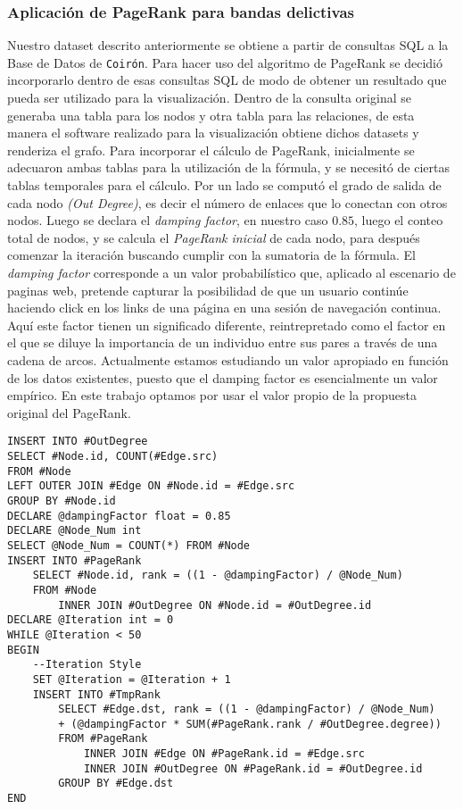 \subsubsection{Aplicación de PageRank para bandas delictivas}
Nuestro dataset descrito anteriormente se obtiene a partir de consultas SQL a la Base de Datos de \texttt{Coirón}. Para hacer uso del algoritmo de PageRank se decidió incorporarlo dentro de esas consultas SQL de modo de obtener un resultado que pueda ser utilizado para la visualización. Dentro de la consulta original se generaba una tabla para los nodos y otra tabla para las relaciones, de esta manera el software realizado para la visualización obtiene dichos datasets y renderiza el grafo.
Para incorporar el cálculo de PageRank, inicialmente se adecuaron ambas tablas para la utilización de la fórmula, y se necesitó de ciertas tablas temporales para el cálculo. Por un lado se computó el grado de salida de cada nodo \textit{(Out Degree)}, es decir el número de enlaces que lo conectan con otros nodos.
Luego se declara el \textit{damping factor}, en nuestro caso $0.85$, luego el conteo total de nodos, y se calcula el \textit{PageRank inicial} de cada nodo, para después comenzar la iteración buscando cumplir con la sumatoria de la fórmula.
El \textit{damping factor} corresponde a un valor probabilístico que, aplicado al escenario de paginas web, pretende capturar la posibilidad de que un usuario continúe haciendo click en los links de una página en una sesión de navegación continua. 
Aquí este factor tienen un significado diferente, reintrepretado como el factor en el que se diluye la importancia de un individuo entre sus pares a través de una cadena de arcos. Actualmente estamos estudiando un valor apropiado en función de los datos existentes, puesto que el damping factor es esencialmente un valor empírico. En este trabajo optamos por usar el valor propio de la propuesta original del PageRank.

\begin{multicols}{2}
\tiny{
\begin{verbatim}
INSERT INTO #OutDegree
SELECT #Node.id, COUNT(#Edge.src)
FROM #Node 
LEFT OUTER JOIN #Edge ON #Node.id = #Edge.src
GROUP BY #Node.id
DECLARE @dampingFactor float = 0.85
DECLARE @Node_Num int
SELECT @Node_Num = COUNT(*) FROM #Node
INSERT INTO #PageRank
	SELECT #Node.id, rank = ((1 - @dampingFactor) / @Node_Num)
	FROM #Node 
		INNER JOIN #OutDegree ON #Node.id = #OutDegree.id
DECLARE @Iteration int = 0
WHILE @Iteration < 50
BEGIN
	--Iteration Style
	SET @Iteration = @Iteration + 1
	INSERT INTO #TmpRank
		SELECT #Edge.dst, rank = ((1 - @dampingFactor) / @Node_Num) 
		+ (@dampingFactor * SUM(#PageRank.rank / #OutDegree.degree))
		FROM #PageRank 
			INNER JOIN #Edge ON #PageRank.id = #Edge.src
			INNER JOIN #OutDegree ON #PageRank.id = #OutDegree.id
		GROUP BY #Edge.dst
END
\end{verbatim}
}
\end{multicols}

